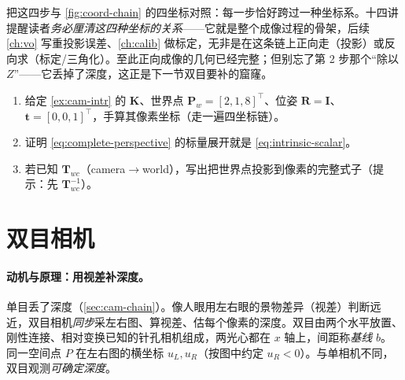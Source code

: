 \noindent 把这四步与 \cref{fig:coord-chain} 的四坐标对照：每一步恰好跨过一种坐标系。十四讲提醒读者\emph{务必厘清这四种坐标的关系}\cite{gaoxiang2019slam14}——它就是整个成像过程的骨架，后续 \cref{ch:vo} 写重投影误差、\cref{ch:calib} 做标定，无非是在这条链上正向走（投影）或反向求（标定/三角化）。至此正向成像的几何已经完整；但别忘了第 2 步那个“除以 $Z$”——它丢掉了深度，这正是下一节双目要补的窟窿。

\begin{practice}
\begin{enumerate}
  \item 给定 \cref{ex:cam-intr} 的 $\mathbf{K}$、世界点 $\mathbf{P}_w=[2,1,8]^\top$、位姿 $\mathbf{R}=\mathbf{I}$、$\mathbf{t}=[0,0,1]^\top$，手算其像素坐标（走一遍四坐标链）。
  \item 证明 \cref{eq:complete-perspective} 的标量展开就是 \cref{eq:intrinsic-scalar}。
  \item 若已知 $\mathbf{T}_{wc}$（camera$\to$world），写出把世界点投影到像素的完整式子（提示：先 $\mathbf{T}_{wc}^{-1}$）。
\end{enumerate}
\end{practice}

\section{双目相机}
\label{sec:cam-stereo}

\paragraph{动机与原理：用视差补深度。}
单目丢了深度（\cref{sec:cam-chain}）。像人眼用左右眼的景物差异（视差）判断远近，双目相机\emph{同步}采左右图、算视差、估每个像素的深度\cite{gaoxiang2019slam14}。双目由两个水平放置、刚性连接、相对变换已知的针孔相机组成，两光心都在 $x$ 轴上，间距称\emph{基线} $b$。同一空间点 $P$ 在左右图的横坐标 $u_L,u_R$（按图中约定 $u_R<0$）。与单相机不同，双目观测\emph{可确定深度}\cite{barfoot2024state}。

